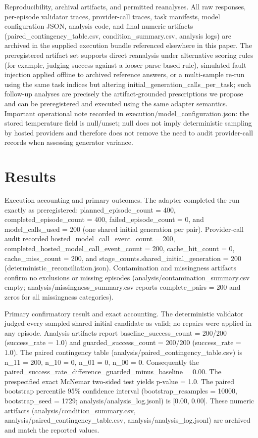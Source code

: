 \documentclass[conference]{IEEEtran}
\begin{document}
Reproducibility, archival artifacts, and permitted reanalyses. All raw responses, per-episode validator traces, provider-call traces, task manifests, model configuration JSON, analysis code, and final numeric artifacts (paired\_contingency\_table.csv, condition\_summary.csv, analysis logs) are archived in the supplied execution bundle referenced elsewhere in this paper. The preregistered artifact set supports direct reanalysis under alternative scoring rules (for example, judging success against a looser parse-based rule), simulated fault-injection applied offline to archived reference answers, or a multi-sample re-run using the same task indices but altering initial\_generation\_calls\_per\_task; such follow-up analyses are precisely the artifact-grounded prescriptions we propose and can be preregistered and executed using the same adapter semantics. Important operational note recorded in execution/model\_configuration.json: the stored temperature field is null/unset; null does not imply deterministic sampling by hosted providers and therefore does not remove the need to audit provider-call records when assessing generator variance.

\section{Results}
Execution accounting and primary outcomes. The adapter completed the run exactly as preregistered: planned\_episode\_count = 400, completed\_episode\_count = 400, failed\_episode\_count = 0, and model\_calls\_used = 200 (one shared initial generation per pair). Provider-call audit recorded hosted\_model\_call\_event\_count = 200, completed\_hosted\_model\_call\_event\_count = 200, cache\_hit\_count = 0, cache\_miss\_count = 200, and stage\_counts.shared\_initial\_generation = 200 (deterministic\_reconciliation.json). Contamination and missingness artifacts confirm no exclusions or missing episodes (analysis/contamination\_summary.csv empty; analysis/missingness\_summary.csv reports complete\_pairs = 200 and zeros for all missingness categories).

Primary confirmatory result and exact accounting. The deterministic validator judged every sampled shared initial candidate as valid; no repairs were applied in any episode. Analysis artifacts report baseline\_success\_count = 200/200 (success\_rate = 1.0) and guarded\_success\_count = 200/200 (success\_rate = 1.0). The paired contingency table (analysis/paired\_contingency\_table.csv) is n\_11 = 200, n\_10 = 0, n\_01 = 0, n\_00 = 0. Consequently the paired\_success\_rate\_difference\_guarded\_minus\_baseline = 0.00. The prespecified exact McNemar two-sided test yields p-value = 1.0. The paired bootstrap percentile 95\% confidence interval (bootstrap\_resamples = 10000, bootstrap\_seed = 1729; analysis/analysis\_log.jsonl) is [0.00, 0.00]. These numeric artifacts (analysis/condition\_summary.csv, analysis/paired\_contingency\_table.csv, analysis/analysis\_log.jsonl) are archived and match the reported values.
\end{document}
